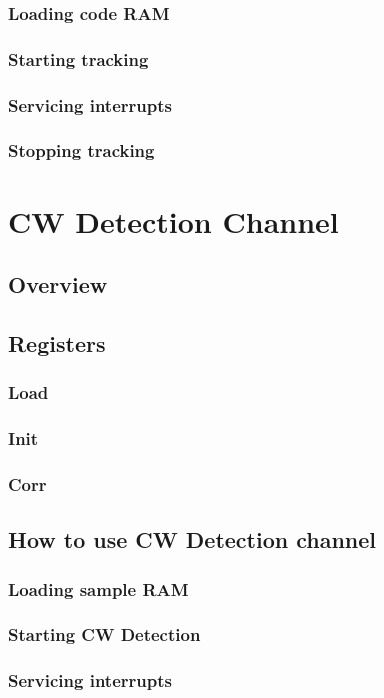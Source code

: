 \documentclass{article}
\begin{document}
\begin{multicols}{2}
\subsubsection{Loading code RAM}
\subsubsection{Starting tracking}
\subsubsection{Servicing interrupts}
\subsubsection{Stopping tracking}

\section{CW Detection Channel}
\subsection{Overview}
\subsection{Registers}
\subsubsection{Load}
\subsubsection{Init}
\subsubsection{Corr}
\subsection{How to use CW Detection channel}
\subsubsection{Loading sample RAM}
\subsubsection{Starting CW Detection}
\subsubsection{Servicing interrupts}

\end{multicols}
\end{document}
